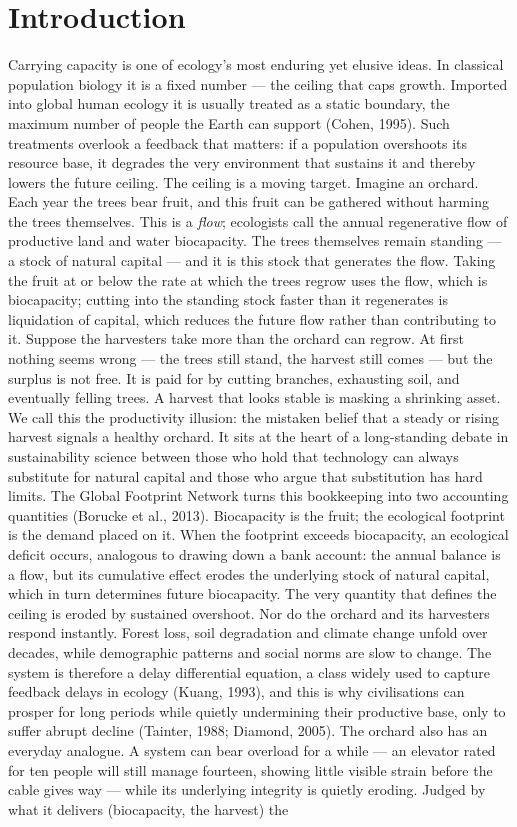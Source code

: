 \documentclass[11pt]{article}
\begin{document}
\section{Introduction}

Carrying capacity is one of ecology's most enduring yet elusive ideas. In classical population biology it is a fixed number — the ceiling that caps growth. Imported into global human ecology it is usually treated as a static boundary, the maximum number of people the Earth can support (Cohen, 1995). Such treatments overlook a feedback that matters: if a population overshoots its resource base, it degrades the very environment that sustains it and thereby lowers the future ceiling. The ceiling is a moving target. Imagine an orchard. Each year the trees bear fruit, and this fruit can be gathered without harming the trees themselves. This is a \emph{flow}; ecologists call the annual regenerative flow of productive land and water biocapacity. The trees themselves remain standing — a stock of natural capital — and it is this stock that generates the flow. Taking the fruit at or below the rate at which the trees regrow uses the flow, which is biocapacity; cutting into the standing stock faster than it regenerates is liquidation of capital, which reduces the future flow rather than contributing to it. Suppose the harvesters take more than the orchard can regrow. At first nothing seems wrong — the trees still stand, the harvest still comes — but the surplus is not free. It is paid for by cutting branches, exhausting soil, and eventually felling trees. A harvest that looks stable is masking a shrinking asset. We call this the productivity illusion: the mistaken belief that a steady or rising harvest signals a healthy orchard. It sits at the heart of a long-standing debate in sustainability science between those who hold that technology can always substitute for natural capital and those who argue that substitution has hard limits. The Global Footprint Network turns this bookkeeping into two accounting quantities (Borucke et al., 2013). Biocapacity is the fruit; the ecological footprint is the demand placed on it. When the footprint exceeds biocapacity, an ecological deficit occurs, analogous to drawing down a bank account: the annual balance is a flow, but its cumulative effect erodes the underlying stock of natural capital, which in turn determines future biocapacity. The very quantity that defines the ceiling is eroded by sustained overshoot. Nor do the orchard and its harvesters respond instantly. Forest loss, soil degradation and climate change unfold over decades, while demographic patterns and social norms are slow to change. The system is therefore a delay differential equation, a class widely used to capture feedback delays in ecology (Kuang, 1993), and this is why civilisations can prosper for long periods while quietly undermining their productive base, only to suffer abrupt decline (Tainter, 1988; Diamond, 2005). The orchard also has an everyday analogue. A system can bear overload for a while — an elevator rated for ten people will still manage fourteen, showing little visible strain before the cable gives way — while its underlying integrity is quietly eroding. Judged by what it delivers (biocapacity, the harvest) the 
\end{document}
